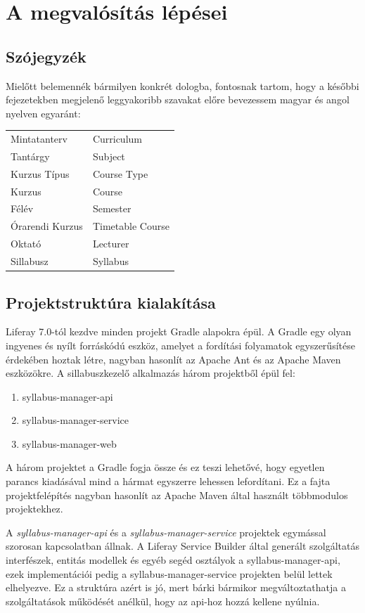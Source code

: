 \documentclass[hidelinks, 12pt, a4paper]{report}
\begin{document}
\chapter{A megvalósítás lépései}

\section{Szójegyzék}

Mielőtt belemennék bármilyen konkrét dologba, fontosnak tartom, hogy a későbbi fejezetekben megjelenő leggyakoribb szavakat előre bevezessem magyar és angol nyelven egyaránt:

\medskip

\begin{tabular}{ l | l }
Mintatanterv & Curriculum \\
Tantárgy & Subject \\
Kurzus Típus & Course Type \\
Kurzus & Course \\
Félév & Semester \\
Órarendi Kurzus & Timetable Course \\
Oktató & Lecturer \\
Sillabusz & Syllabus
\end{tabular}


\section{Projektstruktúra kialakítása}

Liferay 7.0-tól kezdve minden projekt Gradle alapokra épül. A Gradle egy olyan ingyenes és nyílt forráskódú eszköz, amelyet a fordítási folyamatok egyszerűsítése érdekében hoztak létre, nagyban hasonlít az Apache Ant és az Apache Maven eszközökre. A sillabuszkezelő alkalmazás három projektből épül fel:
\begin{enumerate}
\item syllabus-manager-api
\item syllabus-manager-service
\item syllabus-manager-web
\end{enumerate}
A három projektet a Gradle fogja össze és ez teszi lehetővé, hogy egyetlen parancs kiadásával mind a hármat egyszerre lehessen lefordítani. Ez a fajta projektfelépítés nagyban hasonlít az Apache Maven által használt többmodulos projektekhez.

A \emph{syllabus-manager-api} és a \emph{syllabus-manager-service} projektek egymással szorosan kapcsolatban állnak. A Liferay Service Builder által generált szolgáltatás interfészek, entitás modellek és egyéb segéd osztályok a syllabus-manager-api, ezek implementációi pedig a syllabus-manager-service projekten belül lettek elhelyezve. Ez a struktúra azért is jó, mert bárki bármikor megváltoztathatja a szolgáltatások működését anélkül, hogy az api-hoz hozzá kellene nyúlnia.
\end{document}
